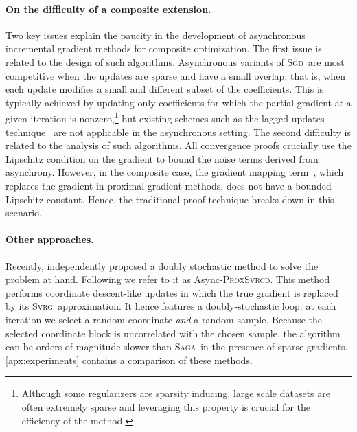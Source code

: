 \documentclass{article}
\newcommand{\SAGA}{\textsc{Saga}}
\newcommand{\SVRG}{\textsc{Svrg}}
\newcommand{\SGD}{\textsc{Sgd}}
\begin{document}
\paragraph{On the difficulty of a composite extension.}
%
%
%
Two key issues explain the paucity in the development of asynchronous incremental gradient methods for composite optimization.
%
The first issue is related to the design of such algorithms.
Asynchronous variants of \SGD\ are most competitive when the updates are sparse and have a small overlap, that is, when each update modifies a small and different subset of the coefficients. This is typically achieved by updating only coefficients for which the partial gradient at a given iteration is nonzero,\footnote{Although some regularizers are sparsity inducing, large scale datasets are often extremely sparse and leveraging this property is crucial for the efficiency of the method.} but existing schemes such as the lagged updates technique~\citep{schmidt2016minimizing} are not applicable in the asynchronous setting.
The second difficulty is related to the analysis of such algorithms.
All convergence proofs crucially use the Lipschitz condition on the gradient to bound the noise terms derived from asynchrony.
However, in the composite case, the gradient mapping term~\citep{beck2009gradient}, which replaces the gradient in proximal-gradient methods, does not have a bounded Lipschitz constant.
Hence, the traditional proof technique breaks down in this scenario.




\paragraph{Other approaches.}
Recently, \citet{meng2017aaai, gu2016asynchronous} independently proposed a doubly stochastic method to solve the problem at hand. Following \citet{meng2017aaai} we refer to it as Async-\textsc{ProxSvrcd}.
This method performs coordinate descent-like updates in which the true gradient is replaced by its \SVRG\ approximation.
It hence features a doubly-stochastic loop: at each iteration we select a random coordinate \emph{and} a random sample.
Because the selected coordinate block is uncorrelated with the chosen sample, the algorithm can be orders of magnitude slower than \SAGA\ in the presence of sparse gradients. \ref{apx:experiments} contains a comparison of these methods.
%
\end{document}
